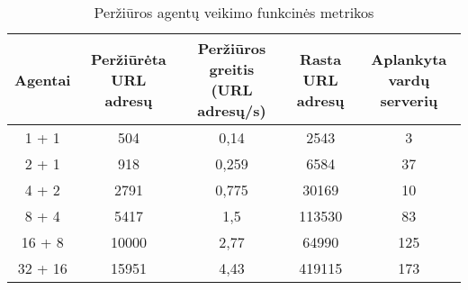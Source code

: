 \begin{table}[htbp]
  \centering
  \caption{Peržiūros agentų veikimo funkcinės metrikos}
    \begin{tabular}{|c|c|c|c|c|}
    \toprule
    \textbf{Agentai} & \multicolumn{1}{p{7em}|}{\textbf{Peržiūrėta URL adresų}} & \multicolumn{1}{p{7.61em}|}{\textbf{ Peržiūros greitis      (URL adresų/s)}} & \multicolumn{1}{p{8.11em}|}{\textbf{Rasta URL adresų}} & \multicolumn{1}{p{6.78em}|}{\textbf{Aplankyta  vardų serverių}} \\
    \midrule
    1 + 1 & 504   & 0,14  & 2543  & 3 \\
    \midrule
    2 + 1 & 918   & 0,259 & 6584  & 37 \\
    \midrule
    4 + 2 & 2791  & 0,775 & 30169 & 10 \\
    \midrule
    8 + 4 & 5417  & 1,5   & 113530 & 83 \\
    \midrule
    16 + 8 & 10000 & 2,77  & 64990 & 125 \\
    \midrule
    32 + 16 & 15951 & 4,43  & 419115 & 173 \\
    \bottomrule
    \end{tabular}%
  \label{tab:crawling_metrics}%
\end{table}%